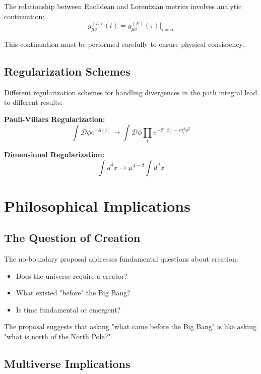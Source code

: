 \documentclass[12pt,a4paper]{article}
\begin{document}
The relationship between Euclidean and Lorentzian metrics involves analytic continuation:
\begin{equation}
g_{\mu\nu}^{(L)}(t) = g_{\mu\nu}^{(E)}(\tau)\big|_{\tau = it}
\end{equation}

This continuation must be performed carefully to ensure physical consistency.

\subsection{Regularization Schemes}

Different regularization schemes for handling divergences in the path integral lead to different results:

\textbf{Pauli-Villars Regularization:}
\begin{equation}
\int \mathcal{D}\phi e^{-S[\phi]} \rightarrow \int \mathcal{D}\phi \prod_i e^{-S[\phi] - m_i^2\phi^2}
\end{equation}

\textbf{Dimensional Regularization:}
\begin{equation}
\int d^4x \rightarrow \mu^{4-d}\int d^d x
\end{equation}

\section{Philosophical Implications}

\subsection{The Question of Creation}

The no-boundary proposal addresses fundamental questions about creation:
\begin{itemize}
    \item Does the universe require a creator?
    \item What existed "before" the Big Bang?
    \item Is time fundamental or emergent?
\end{itemize}

The proposal suggests that asking "what came before the Big Bang" is like asking "what is north of the North Pole?"

\subsection{Multiverse Implications}
\end{document}
